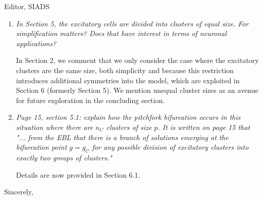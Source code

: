 \documentclass[11pt]{letter}
\begin{document}
\begin{letter}{Editor, SIADS}
\begin{enumerate}
\item \emph{In Section 5, the excitatory cells are divided into clusters of equal size. For simplification matters? Does that have interest in terms of neuronal applications? } 

\vspace{4mm} 
In Section 2, we comment that we only consider the case where the excitatory clusters are the same size, both simplicity and because this restriction introduces additional symmetries into the model, which are exploited in Section 6 (formerly Section 5). We mention unequal cluster sizes as an avenue for future exploration in the concluding section.



\item \emph{Page 15, section 5.1: explain how the pitchfork bifurcation occurs in this situation where there are $n_C$ clusters of size $p$. It is written on page 15 that "... from the EBL that there is a branch of solutions emerging at the bifurcation point $g = g_C$ for any possible division of excitatory clusters into exactly two groups of clusters." }
\vspace{4mm} 

Details are now provided in Section 6.1.


\end{enumerate}


\closing{Sincerely,}

\end{letter}
\end{document}
